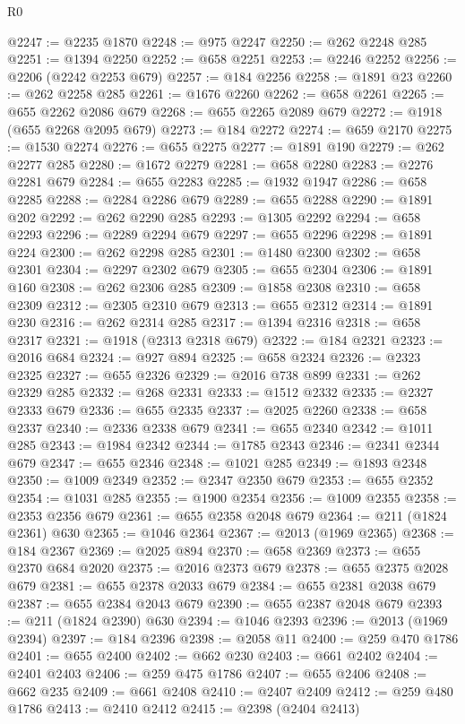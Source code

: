 \begin{lexlean}{R0}
\begin{coremodule}
@2247 := @2235 @1870
@2248 := @975 @2247
@2250 := @262 @2248 @285
@2251 := @1394 @2250
@2252 := @658 @2251
@2253 := @2246 @2252
@2256 := @2206 (@2242 @2253 @679)
@2257 := @184 @2256
@2258 := @1891 @23
@2260 := @262 @2258 @285
@2261 := @1676 @2260
@2262 := @658 @2261
@2265 := @655 @2262 @2086 @679
@2268 := @655 @2265 @2089 @679
@2272 := @1918 (@655 @2268 @2095 @679)
@2273 := @184 @2272
@2274 := @659 @2170
@2275 := @1530 @2274
@2276 := @655 @2275
@2277 := @1891 @190
@2279 := @262 @2277 @285
@2280 := @1672 @2279
@2281 := @658 @2280
@2283 := @2276 @2281 @679
@2284 := @655 @2283
@2285 := @1932 @1947
@2286 := @658 @2285
@2288 := @2284 @2286 @679
@2289 := @655 @2288
@2290 := @1891 @202
@2292 := @262 @2290 @285
@2293 := @1305 @2292
@2294 := @658 @2293
@2296 := @2289 @2294 @679
@2297 := @655 @2296
@2298 := @1891 @224
@2300 := @262 @2298 @285
@2301 := @1480 @2300
@2302 := @658 @2301
@2304 := @2297 @2302 @679
@2305 := @655 @2304
@2306 := @1891 @160
@2308 := @262 @2306 @285
@2309 := @1858 @2308
@2310 := @658 @2309
@2312 := @2305 @2310 @679
@2313 := @655 @2312
@2314 := @1891 @230
@2316 := @262 @2314 @285
@2317 := @1394 @2316
@2318 := @658 @2317
@2321 := @1918 (@2313 @2318 @679)
@2322 := @184 @2321
@2323 := @2016 @684
@2324 := @927 @894
@2325 := @658 @2324
@2326 := @2323 @2325
@2327 := @655 @2326
@2329 := @2016 @738 @899
@2331 := @262 @2329 @285
@2332 := @268 @2331
@2333 := @1512 @2332
@2335 := @2327 @2333 @679
@2336 := @655 @2335
@2337 := @2025 @2260
@2338 := @658 @2337
@2340 := @2336 @2338 @679
@2341 := @655 @2340
@2342 := @1011 @285
@2343 := @1984 @2342
@2344 := @1785 @2343
@2346 := @2341 @2344 @679
@2347 := @655 @2346
@2348 := @1021 @285
@2349 := @1893 @2348
@2350 := @1009 @2349
@2352 := @2347 @2350 @679
@2353 := @655 @2352
@2354 := @1031 @285
@2355 := @1900 @2354
@2356 := @1009 @2355
@2358 := @2353 @2356 @679
@2361 := @655 @2358 @2048 @679
@2364 := @211 (@1824 @2361) @630
@2365 := @1046 @2364
@2367 := @2013 (@1969 @2365)
@2368 := @184 @2367
@2369 := @2025 @894
@2370 := @658 @2369
@2373 := @655 @2370 @684 @2020
@2375 := @2016 @2373 @679
@2378 := @655 @2375 @2028 @679
@2381 := @655 @2378 @2033 @679
@2384 := @655 @2381 @2038 @679
@2387 := @655 @2384 @2043 @679
@2390 := @655 @2387 @2048 @679
@2393 := @211 (@1824 @2390) @630
@2394 := @1046 @2393
@2396 := @2013 (@1969 @2394)
@2397 := @184 @2396
@2398 := @2058 @11
@2400 := @259 @470 @1786
@2401 := @655 @2400
@2402 := @662 @230
@2403 := @661 @2402
@2404 := @2401 @2403
@2406 := @259 @475 @1786
@2407 := @655 @2406
@2408 := @662 @235
@2409 := @661 @2408
@2410 := @2407 @2409
@2412 := @259 @480 @1786
@2413 := @2410 @2412
@2415 := @2398 (@2404 @2413)

\end{coremodule}
\end{lexlean}
